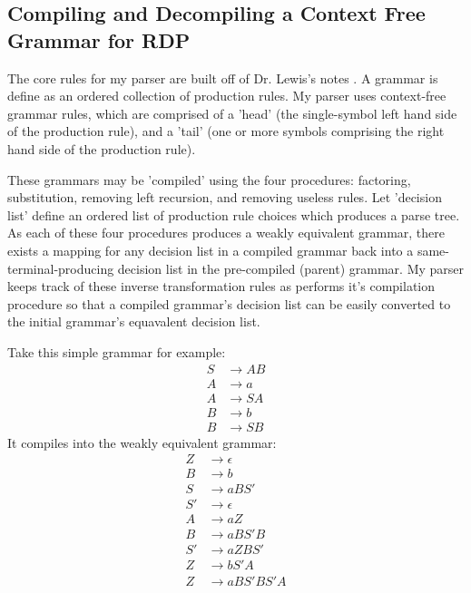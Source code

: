 \documentclass[11pt]{article}
\begin{document}
\clearpage

\subsection{Compiling and Decompiling a Context Free Grammar for RDP}
The core rules for my parser are built off of Dr. Lewis's notes \cite{lewis}.
A grammar is define as an ordered collection of production rules.
My parser uses context-free grammar rules, which are comprised of a
'head' (the single-symbol left hand side of the production rule), and a 'tail'
(one or more symbols comprising the right hand side of the production rule).

These grammars may be 'compiled' using the four procedures:
factoring, substitution, removing left recursion, and removing useless
rules. Let 'decision list' define an ordered list of production rule
choices which produces a parse tree.
As each of these four procedures produces a weakly equivalent grammar,
there exists a mapping for any decision list in a compiled grammar
back into a same-terminal-producing decision list in the pre-compiled (parent) grammar.
My parser keeps track of these inverse transformation rules as performs
it's compilation procedure so that a compiled grammar's decision list can be easily
converted to the initial grammar's equavalent decision list. 

Take this simple grammar for example:
\setcounter{equation}{0}
\begin{align}
S &\rightarrow A B\\
A &\rightarrow a\\
A &\rightarrow S A\\
B &\rightarrow b\\
B &\rightarrow S B
\end{align}
It compiles into the weakly equivalent grammar:
\setcounter{equation}{0}
\begin{align}
Z &\rightarrow \epsilon\\
B &\rightarrow b\\
S &\rightarrow a B S'\\
S' &\rightarrow \epsilon\\
A &\rightarrow a Z\\
B &\rightarrow a B S' B\\
S' &\rightarrow a Z B S'\\
Z &\rightarrow b S' A\\
Z &\rightarrow a B S' B S' A
\end{align}
\end{document}
